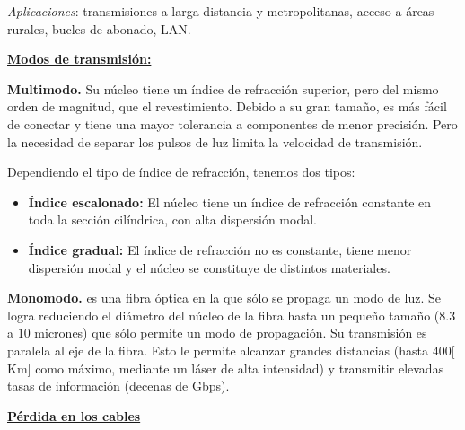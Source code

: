 \documentclass[10pt,a4paper]{article}
\begin{document}
\vspace{10pt}

\textit{Aplicaciones}: transmisiones a larga distancia y metropolitanas, acceso a áreas rurales, bucles de abonado, LAN.

\underline{\textbf{Modos de transmisión:}}
\begin{description}
\item \textbf{Multimodo.} Su núcleo tiene un índice de refracción superior, pero del mismo orden de magnitud, que el revestimiento. Debido a su gran tamaño, es más fácil de conectar y tiene una mayor tolerancia a componentes de menor precisión. Pero la necesidad de separar los pulsos de luz limita la velocidad de transmisión.

Dependiendo el tipo de índice de refracción, tenemos dos tipos:
\begin{itemize}
\item \textbf{Índice escalonado:} El núcleo tiene un índice de refracción constante en toda la sección cilíndrica, con alta dispersión modal.
\item \textbf{Índice gradual:} El índice de refracción no es constante, tiene menor dispersión modal y el núcleo se constituye de distintos materiales.
\end{itemize}
\item \textbf{Monomodo.} es una fibra óptica en la que sólo se propaga un modo de luz. Se logra reduciendo el diámetro del núcleo de la fibra hasta un pequeño tamaño ($8.3$ a $10$ micrones) que sólo permite un modo de propagación. Su transmisión es paralela al eje de la fibra. Esto le permite alcanzar grandes distancias (hasta $400 [$Km$]$ como máximo, mediante un láser de alta intensidad) y transmitir elevadas tasas de información (decenas de Gbps).
\end{description}

\underline{\textbf{Pérdida en los cables}}
\end{document}
